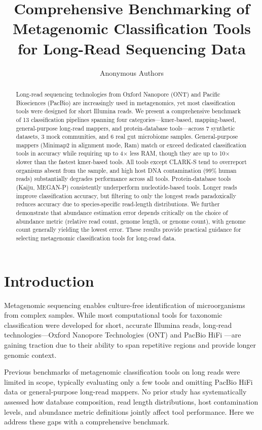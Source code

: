 \documentclass[11pt]{article}
\title{Comprehensive Benchmarking of Metagenomic Classification Tools for Long-Read Sequencing Data}
\author{Anonymous Authors}
\date{}
\begin{document}
\maketitle

\begin{abstract}
Long-read sequencing technologies from Oxford Nanopore (ONT) and Pacific Biosciences (PacBio) are increasingly used in metagenomics, yet most classification tools were designed for short Illumina reads. We present a comprehensive benchmark of 13 classification pipelines spanning four categories---kmer-based, mapping-based, general-purpose long-read mappers, and protein-database tools---across 7 synthetic datasets, 3 mock communities, and 6 real gut microbiome samples. General-purpose mappers (Minimap2 in alignment mode, Ram) match or exceed dedicated classification tools in accuracy while requiring up to 4$\times$ less RAM, though they are up to 10$\times$ slower than the fastest kmer-based tools. All tools except CLARK-S tend to overreport organisms absent from the sample, and high host DNA contamination (99\% human reads) substantially degrades performance across all tools. Protein-database tools (Kaiju, MEGAN-P) consistently underperform nucleotide-based tools. Longer reads improve classification accuracy, but filtering to only the longest reads paradoxically reduces accuracy due to species-specific read-length distributions. We further demonstrate that abundance estimation error depends critically on the choice of abundance metric (relative read count, genome length, or genome count), with genome count generally yielding the lowest error. These results provide practical guidance for selecting metagenomic classification tools for long-read data.
\end{abstract}

\section{Introduction}

Metagenomic sequencing enables culture-free identification of microorganisms from complex samples. While most computational tools for taxonomic classification were developed for short, accurate Illumina reads, long-read technologies---Oxford Nanopore Technologies (ONT) \citep{loman2015complete} and PacBio HiFi \citep{wenger2019accurate}---are gaining traction due to their ability to span repetitive regions and provide longer genomic context.

Previous benchmarks of metagenomic classification tools on long reads were limited in scope, typically evaluating only a few tools and omitting PacBio HiFi data or general-purpose long-read mappers. No prior study has systematically assessed how database composition, read length distributions, host contamination levels, and abundance metric definitions jointly affect tool performance. Here we address these gaps with a comprehensive benchmark.
\end{document}
